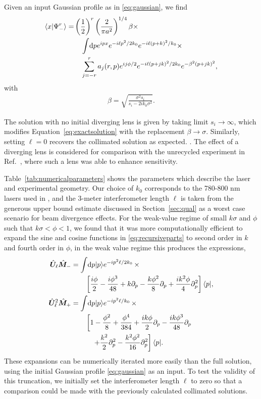 Given an input Gaussian profile as in \eqref{eq:gaussian}, we find 
\begin{align}\label{eq:exactsolution}
\langle x \vert \Psi_-^r \rangle =& \left(\frac{1}{2}\right)^{r}\left(\frac{2}{\pi a^2}\right)^{1/4} \beta \times \\
&\quad \int \!\mathrm{d}p e^{ipx} e^{-i\ell p^2/2k_0}e^{-i\ell (p+k)^2/k_0}  \times \nonumber \\
&\quad \sum_{j=-r}^{r}a_j(r,p)e^{ij\phi/2}e^{-i\ell(p+jk)^2/2k_0}e^{-\beta^2(p+jk)^2}, \nonumber 
\end{align}
with 
\begin{align}
\beta = \sqrt{\frac{\sigma^2 s_i}{s_i - 2ik_0\sigma^2}}.
\end{align} 

The solution with no initial diverging lens is given by taking limit $s_i \rightarrow \infty$, which modifies Equation~\eqref{eq:exactsolution} with the replacement $\beta \rightarrow \sigma$.  Similarly, setting $\ell = 0$ recovers the collimated solution as expected. 
.  The effect of a diverging lens is considered for comparison with the unrecycled experiment in Ref.~\cite{Dixon2009}, where such a lens was able to enhance sensitivity.  

Table~\ref{tab:numericalparameters} shows the parameters which describe the laser and experimental geometry. Our choice of $k_0$ corresponds to the 780-800 nm lasers used in \cite{Dixon2009,Starling2009,Starling2010a,Starling2010b}, and the 3-meter interferometer length $\ell$ is taken from the generous upper bound estimate discussed in Section~\ref{sec:qual} as a worst case scenario for beam divergence effects.  For the weak-value regime of small $k\sigma$ and $\phi$ such that $k\sigma < \phi < 1$, we found that it was more computationally efficient to expand the sine and cosine functions in \eqref{eq:recursiveparts} to second order in $k$ and fourth order in $\phi$, in the weak value regime this produces the expressions, 
\begin{subequations}\label{eq:approximateexpansions}
\begin{align}
 \hat{\bm U}_\ell\hat{\bm M}_- &= \int \! \mathrm{d}p\lvert p\rangle e^{-ip^2\ell/2k_0}\, \times \\
 &\qquad \left[\frac{i\phi}{2} -\frac{i\phi^3}{48} + k\partial_p - \frac{k\phi^2}{8}\partial_p + \frac{ik^2\phi}{4} \partial_p^2\right]\langle p \rvert, \nonumber \\
 \hat{\bm U}_\ell^2 \hat{\bm M}_+ &= \int \! \mathrm{d}p\lvert p\rangle e^{-ip^2\ell/k_0}\, \times \\
 &\qquad \left[1 - \frac{\phi^2}{8} + \frac{\phi^4}{384} + \frac{ik\phi}{2}\partial_p - \frac{ik\phi^3}{48}\partial_p \right.\nonumber \\
 &\qquad\quad\left. + \frac{k^2}{2}\partial_p^2 - \frac{k^2\phi^2}{16}\partial_p^2\right]\langle p \rvert . \nonumber
\end{align}
\end{subequations}
These expansions can be numerically iterated more easily than the full solution, using the initial Gaussian profile \eqref{eq:gaussian} as an input.  To test the validity of this truncation, we initially set the interferometer length $\ell$ to zero so that a comparison could be made with the previously calculated collimated solutions.


